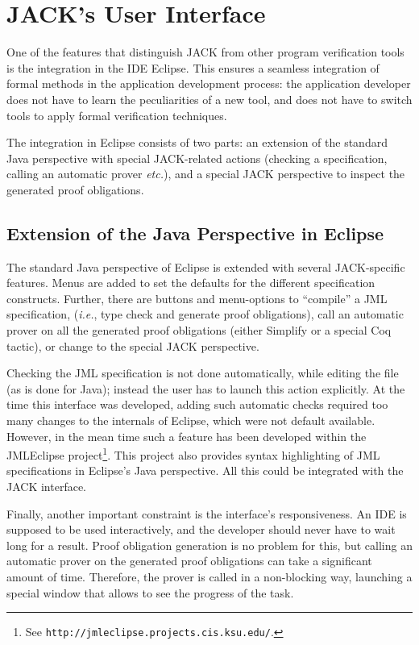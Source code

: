 
\section{JACK's User Interface}\label{SecUI}

One of the features that distinguish JACK from other program
verification tools is the integration in the IDE Eclipse. This ensures
a seamless integration of formal methods in the application
development process: the application developer does not have to learn
the peculiarities of a new tool, and does not have to switch tools to
apply formal verification techniques.

The integration in Eclipse consists of two parts: an extension of the
standard Java perspective with special JACK-related actions (checking a
specification, calling an automatic prover \emph{etc.}), and a
special JACK perspective to inspect the generated proof
obligations.

\subsection{Extension of the Java Perspective in Eclipse}

The standard Java perspective of Eclipse is extended with several
JACK-specific features. Menus are added to set the defaults for the
different specification constructs. Further, there are buttons and
menu-options to ``compile'' a JML specification, (\emph{i.e.}, type
check and generate proof obligations), call an automatic prover on all
the generated proof obligations (either Simplify or a special
Coq tactic), or change to the special JACK perspective.  

Checking the JML specification is not done automatically, while
editing the file (as is done for Java); instead the user has to launch
this action explicitly. At the time this interface was developed,
adding such automatic checks required too many changes to the
internals of Eclipse, which were not default available. However, in
the mean time such a feature has been developed within the JMLEclipse
project\footnote{See
\texttt{http://jmleclipse.projects.cis.ksu.edu/}.}. This project also
provides syntax highlighting of JML specifications in Eclipse's Java
perspective. All this could be integrated with the JACK interface. 


Finally, another important constraint is the interface's
responsiveness. An IDE is supposed to be used interactively, and the
developer should never have to wait long for a result. Proof
obligation generation is no problem for this, but calling an automatic
prover on the generated proof obligations can take a significant
amount of time. Therefore, the prover is called in a non-blocking way,
launching a special window that allows to see the progress of the
task.

